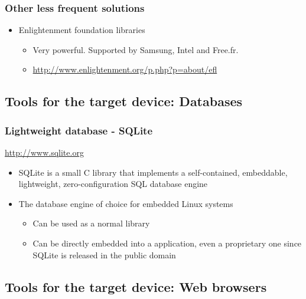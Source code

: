 \begin{frame}
  \frametitle{Other less frequent solutions}
  \begin{itemize}
  \item Enlightenment foundation libraries
    \begin{itemize}
    \item Very powerful. Supported by Samsung, Intel and Free.fr.
    \item \url{http://www.enlightenment.org/p.php?p=about/efl}
    \end{itemize}
  \end{itemize}
\end{frame}

\subsection[Databases]{Tools for the target device: Databases}

\begin{frame}
  \frametitle{Lightweight database - SQLite}
  \url{http://www.sqlite.org}

  \begin{itemize}
  \item SQLite is a small C library that implements a self-contained,
    embeddable, lightweight, zero-configuration SQL database engine
  \item The database engine of choice for embedded Linux systems
    \begin{itemize}
    \item Can be used as a normal library
    \item Can be directly embedded into a application, even a
      proprietary one since SQLite is released in the public domain
    \end{itemize}
  \end{itemize}
\end{frame}

\subsection[Web Browsers]{Tools for the target device: Web browsers}

